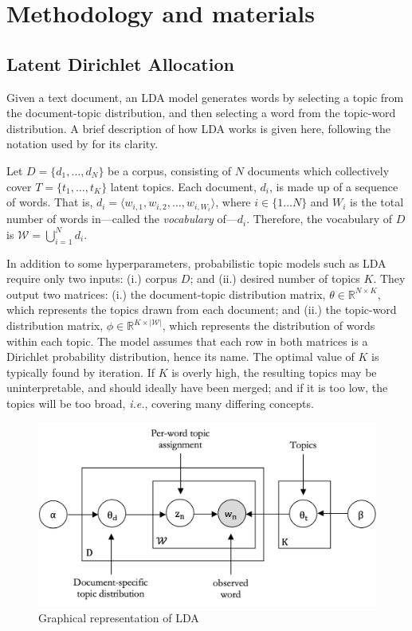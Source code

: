 \section{Methodology and materials}
\label{sec:4-methodology}

\subsection{Latent Dirichlet Allocation}
\label{ssec:4-LDA}

Given a text document, an \ac{LDA} model generates words by selecting a topic from the document-topic distribution, and then selecting a word from the topic-word distribution. A brief description of how \ac{LDA} works is given here, following the notation used by  for its clarity.

Let $D = \{d_1, \ldots, d_N\}$ be a corpus, consisting of $N$ documents which collectively cover $T = \{t_1, \ldots, t_K\}$ latent topics. Each document, $d_i$, is made up of a sequence of words. That is, $d_i = \langle w_{i,1}, w_{i,2}, \dots, w_{i,W_i} \rangle$, where $i \in \{1 \dots N\}$ and $W_i$ is the total number of words in—called the \emph{vocabulary} of—$d_i$. Therefore, the vocabulary of $D$ is $\mathscr{W} = \bigcup\limits_{i=1}^N d_i$.

In addition to some hyperparameters, probabilistic topic models such as \ac{LDA} require only two inputs: (i.) corpus $D$; and (ii.) desired number of topics $K$. They output two matrices: (i.) the document-topic distribution matrix, $\theta \in \mathbb{R}^{N \times K}$, which represents the topics drawn from each document; and (ii.) the topic-word distribution matrix, $\phi \in \mathbb{R}^{K \times |\mathscr{W}|}$, which represents the distribution of words within each topic. The model assumes that each row in both matrices is a Dirichlet probability distribution, hence its name. The optimal value of $K$ is typically found by iteration. If $K$ is overly high, the resulting topics may be uninterpretable, and should ideally have been merged; and if it is too low, the topics will be too broad, \emph{i.e.}, covering many differing concepts.

\begin{figure}[h]
  \myfloatalign
  \includegraphics[width=\textwidth]{gfx/LDA_model}
  \caption{Graphical representation of \ac{LDA}}
  \label{fig:4-LDA}
\end{figure}

